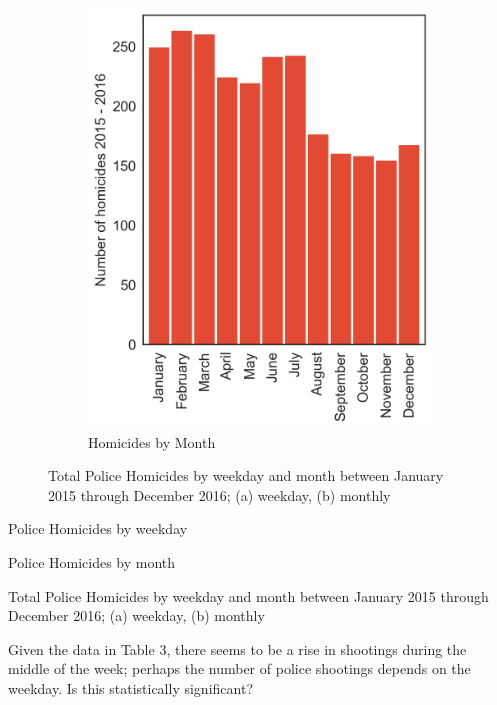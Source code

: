 \documentclass[12pt, titlepage]{article}
\begin{document}
\begin{figure}[ht!]
\begin{subfigure}[t]{0.5\textwidth}
        \includegraphics[width=.9\textwidth]{assets/week_month_frequency_(ivb).png}
        \caption{Homicides by Month}
    \end{subfigure}
	\caption{Total Police Homicides by weekday and month between January 2015 through December 2016; (a) weekday, (b) monthly}
\end{figure}

\setcounter{table}{0}

\begin{table}[ht!]
    \centering
    \begin{subtable}[t]{0.5\textwidth}
		\caption{Police Homicides by weekday}
    \end{subtable}%
    \begin{subtable}[t]{0.5\textwidth}
		\caption{Police Homicides by month}
    \end{subtable}
    \caption{Total Police Homicides by weekday and month between January 2015 through December 2016; (a) weekday, (b) monthly}
\end{table}
\pagebreak
Given the data in Table 3, there seems to be a rise in shootings during the middle of the week; perhaps the number of police shootings depends on the weekday. Is this statistically significant?\\
\end{document}
